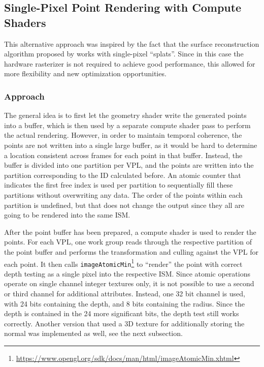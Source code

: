 \subsection{Single-Pixel Point Rendering with Compute Shaders}
\label{sec:impl:singlePixelRendering}

This alternative approach was inspired by the fact that the surface reconstruction algorithm proposed by \citet{Marroquim:2007:reconstruction} works with single-pixel ``splats''. Since in this case the hardware rasterizer is not required to achieve good performance, this allowed for more flexibility and new optimization opportunities.

\subsubsection{Approach}

The general idea is to first let the geometry shader write the generated points into a buffer, which is then used by a separate compute shader pass to perform the actual rendering. However, in order to maintain temporal coherence, the points are not written into a single large buffer, as it would be hard to determine a location consistent across frames for each point in that buffer. Instead, the buffer is divided into one partition per VPL, and the points are written into the partition corresponding to the ID calculated before. An atomic counter that indicates the first free index is used per partition to sequentially fill these partitions without overwriting any data. The order of the points within each partition is undefined, but that does not change the output since they all are going to be rendered into the same ISM.

After the point buffer has been prepared, a compute shader is used to render the points. For each VPL, one work group reads through the respective partition of the point buffer and performs the transformation and culling against the VPL for each point. It then calls \texttt{imageAtomicMin}\footnote{\url{https://www.opengl.org/sdk/docs/man/html/imageAtomicMin.xhtml}} to ``render'' the point with correct depth testing as a single pixel into the respective ISM. Since atomic operations operate on single channel integer textures only, it is not possible to use a second or third channel for additional attributes. Instead, one 32 bit channel is used, with 24 bits containing the depth, and 8 bits containing the radius. Since the depth is contained in the 24 more significant bits, the depth test still works correctly. Another version that used a 3D texture for additionally storing the normal was implemented as well, see the next subsection.

